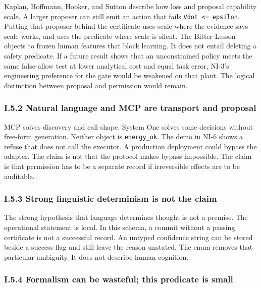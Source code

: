 \documentclass[
  10pt,
]{article}
\begin{document}
Kaplan, Hoffmann, Hooker, and Sutton describe how loss and proposal
capability scale. A larger proposer can still emit an action that fails
\texttt{Vdot\ \textless{}=\ epsilon}. Putting that proposer behind the
certificate uses scale where the evidence says scale works, and uses the
predicate where scale is silent. The Bitter Lesson objects to frozen
human features that block learning. It does not entail deleting a safety
predicate. If a future result shows that an unconstrained policy meets
the same false-allow test at lower analytical cost and equal task error,
NI-3's engineering preference for the gate would be weakened on that
plant. The logical distinction between proposal and permission would
remain.

\subsubsection{I.5.2 Natural language and MCP are transport and
proposal}\label{i.5.2-natural-language-and-mcp-are-transport-and-proposal}

MCP solves discovery and call shape. System One solves some decisions
without free-form generation. Neither object is \texttt{energy\_ok}. The
demo in NI-6 shows a refuse that does not call the executor. A
production deployment could bypass the adapter. The claim is not that
the protocol makes bypass impossible. The claim is that permission has
to be a separate record if irreversible effects are to be auditable.

\subsubsection{I.5.3 Strong linguistic determinism is not the
claim}\label{i.5.3-strong-linguistic-determinism-is-not-the-claim}

The strong hypothesis that language determines thought is not a premise.
The operational statement is local. In this schema, a commit without a
passing certificate is not a successful record. An untyped confidence
string can be stored beside a success flag and still leave the reason
unstated. The enum removes that particular ambiguity. It does not
describe human cognition.

\subsubsection{I.5.4 Formalism can be wasteful; this predicate is
small}\label{i.5.4-formalism-can-be-wasteful-this-predicate-is-small}
\end{document}
